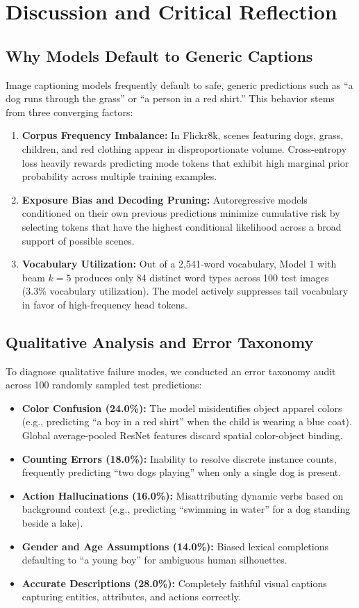 \documentclass[conference]{IEEEtran}
\begin{document}
\section{Discussion and Critical Reflection}
\subsection{Why Models Default to Generic Captions}
Image captioning models frequently default to safe, generic predictions such as ``a dog runs through the grass'' or ``a person in a red shirt.'' This behavior stems from three converging factors:
\begin{enumerate}
    \item \textbf{Corpus Frequency Imbalance:} In Flickr8k, scenes featuring dogs, grass, children, and red clothing appear in disproportionate volume. Cross-entropy loss heavily rewards predicting mode tokens that exhibit high marginal prior probability across multiple training examples.
    \item \textbf{Exposure Bias and Decoding Pruning:} Autoregressive models conditioned on their own previous predictions minimize cumulative risk by selecting tokens that have the highest conditional likelihood across a broad support of possible scenes.
    \item \textbf{Vocabulary Utilization:} Out of a 2,541-word vocabulary, Model 1 with beam $k=5$ produces only 84 distinct word types across 100 test images (3.3\% vocabulary utilization). The model actively suppresses tail vocabulary in favor of high-frequency head tokens.
\end{enumerate}

\subsection{Qualitative Analysis and Error Taxonomy}
To diagnose qualitative failure modes, we conducted an error taxonomy audit across 100 randomly sampled test predictions:
\begin{itemize}
    \item \textbf{Color Confusion (24.0\%):} The model misidentifies object apparel colors (e.g., predicting ``a boy in a red shirt'' when the child is wearing a blue coat). Global average-pooled ResNet features discard spatial color-object binding.
    \item \textbf{Counting Errors (18.0\%):} Inability to resolve discrete instance counts, frequently predicting ``two dogs playing'' when only a single dog is present.
    \item \textbf{Action Hallucinations (16.0\%):} Misattributing dynamic verbs based on background context (e.g., predicting ``swimming in water'' for a dog standing beside a lake).
    \item \textbf{Gender and Age Assumptions (14.0\%):} Biased lexical completions defaulting to ``a young boy'' for ambiguous human silhouettes.
    \item \textbf{Accurate Descriptions (28.0\%):} Completely faithful visual captions capturing entities, attributes, and actions correctly.
\end{itemize}
\end{document}
